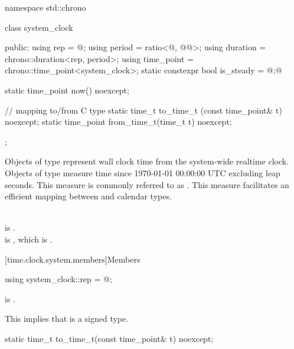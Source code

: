 \begin{codeblock}
namespace std::chrono {
  class system_clock {
  public:
    using rep        = @\seebelow@;
    using period     = ratio<@\unspecnc@, @\unspec{}@>;
    using duration   = chrono::duration<rep, period>;
    using time_point = chrono::time_point<system_clock>;
    static constexpr bool is_steady = @\unspec;@

    static time_point now() noexcept;

    // mapping to/from C type 
    static time_t      to_time_t  (const time_point& t) noexcept;
    static time_point  from_time_t(time_t t) noexcept;
  };
}
\end{codeblock}

\pnum
Objects of type  represent wall clock time from the system-wide
realtime clock.
Objects of type  measure time since
1970-01-01 00:00:00 UTC excluding leap seconds.
This measure is commonly referred to as .
This measure facilitates an efficient mapping between
 and calendar types.
\begin{example}
\\
 is . \\
 is ,
which is . \\
\end{example}

[time.clock.system.members]{Members}

%
\begin{itemdecl}
using system_clock::rep = @\unspec@;
\end{itemdecl}

\begin{itemdescr}
\pnum
\constraints
{} is . \\
\begin{note}
This implies that  is a signed type.
\end{note}
\end{itemdescr}

%
\begin{itemdecl}
static time_t to_time_t(const time_point& t) noexcept;
\end{itemdecl}

